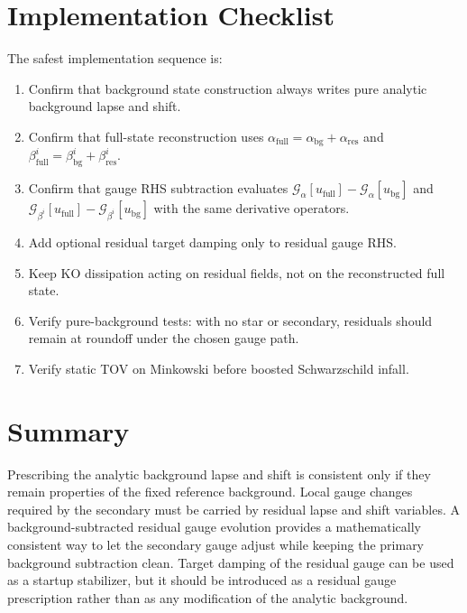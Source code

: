 \documentclass[11pt]{article}
\newcommand{\ubg}{u_{\mathrm{bg}}}
\newcommand{\ufull}{u_{\mathrm{full}}}
\newcommand{\abg}{\alpha_{\mathrm{bg}}}
\newcommand{\ares}{\alpha_{\mathrm{res}}}
\newcommand{\afull}{\alpha_{\mathrm{full}}}
\newcommand{\bbg}{\beta^i_{\mathrm{bg}}}
\newcommand{\bres}{\beta^i_{\mathrm{res}}}
\newcommand{\bfull}{\beta^i_{\mathrm{full}}}
\newcommand{\gaugea}{\mathcal{G}_{\alpha}}
\newcommand{\gaugeb}{\mathcal{G}_{\beta^i}}
\begin{document}
\section{Implementation Checklist}

The safest implementation sequence is:
\begin{enumerate}[label=\arabic*.]
  \item Confirm that background state construction always writes pure analytic
  background lapse and shift.
  \item Confirm that full-state reconstruction uses
  \(\afull=\abg+\ares\) and \(\bfull=\bbg+\bres\).
  \item Confirm that gauge RHS subtraction evaluates
  \(\gaugea[\ufull]-\gaugea[\ubg]\) and
  \(\gaugeb[\ufull]-\gaugeb[\ubg]\) with the same derivative operators.
  \item Add optional residual target damping only to residual gauge RHS.
  \item Keep KO dissipation acting on residual fields, not on the reconstructed
  full state.
  \item Verify pure-background tests: with no star or secondary, residuals
  should remain at roundoff under the chosen gauge path.
  \item Verify static TOV on Minkowski before boosted Schwarzschild infall.
\end{enumerate}

\section{Summary}

Prescribing the analytic background lapse and shift is consistent only if they
remain properties of the fixed reference background.  Local gauge changes
required by the secondary must be carried by residual lapse and shift
variables.  A background-subtracted residual gauge evolution provides a
mathematically consistent way to let the secondary gauge adjust while keeping
the primary background subtraction clean.  Target damping of the residual
gauge can be used as a startup stabilizer, but it should be introduced as a
residual gauge prescription rather than as any modification of the analytic
background.
\end{document}
